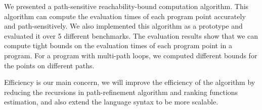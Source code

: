 We presented a path-sensitive reachability-bound computation algorithm.
This algorithm can compute the evaluation times of each program point accurately and path-sensitively.
We also implemented this algorithm as a prototype and evaluated it over 5 different benchmarks.
The evaluation results show that we can compute tight bounds on the evaluation times of each program point in a program. For a program with multi-path loops, we computed different bounds for the points on different paths.

Efficiency is our main concern, we will improve the efficiency of the algorithm by reducing the recursions in path-refinement algorithm and ranking functions estimation, and also extend the language syntax
to be more scalable.